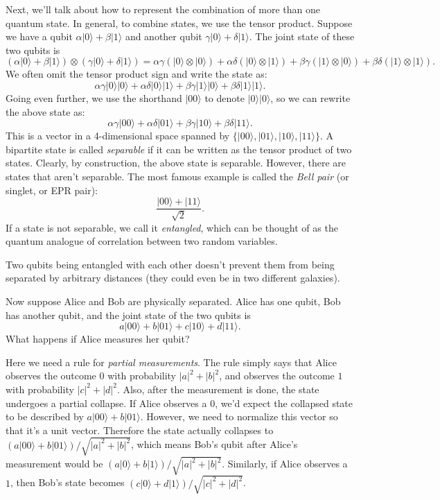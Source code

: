 \documentclass[11pt]{report}
\theoremstyle{plain}
\theoremstyle{definition}
\renewcommand{\ket}[1]{|#1\rangle}
\newcommand{\tensor}{\otimes}
\begin{document}
Next, we'll talk about how to represent the combination of more than one quantum state. In general, to combine states, we use the tensor product. Suppose we have a qubit $\alpha \ket{0} + \beta \ket{1}$ and another qubit $\gamma \ket{0} + \delta \ket{1}$. The joint state of these two qubits is
\[
(\alpha \ket{0} + \beta \ket{1}) \tensor (\gamma \ket{0} + \delta \ket{1}) = \alpha \gamma (\ket{0} \tensor \ket{0}) + \alpha \delta (\ket{0} \tensor \ket{1}) + \beta \gamma (\ket{1} \tensor \ket{0}) + \beta \delta (\ket{1} \tensor \ket{1}).
\]
We often omit the tensor product sign and write the state as:
\[
\alpha \gamma \ket{0}  \ket{0} + \alpha \delta \ket{0}  \ket{1} + \beta \gamma \ket{1}  \ket{0} + \beta \delta \ket{1}  \ket{1}.
\]
Going even further, we use the shorthand $\ket{00}$ to denote $\ket{0}\ket{0}$, so we can rewrite the above state as:
\[
\alpha \gamma \ket{00} + \alpha \delta \ket{01} + \beta \gamma \ket{10} + \beta \delta \ket{11}.
\]
This is a vector in a 4-dimensional space spanned by $\{\ket{00}, \ket{01}, \ket{10}, \ket{11}\}$. A bipartite state is called \emph{separable} if it can be written as the tensor product of two states. Clearly, by construction, the above state is separable. However, there are states that aren't separable. The most famous example is called the {\em Bell pair} (or singlet, or EPR pair):
\[
\frac{\ket{00} + \ket{11}}{\sqrt{2}}.
\]
If a state is not separable, we call it \emph{entangled}, which can be thought of as the quantum analogue of correlation between two random variables.

Two qubits being entangled with each other doesn't prevent them from being separated by arbitrary distances (they could even be in two different galaxies).

Now suppose Alice and Bob are physically separated. Alice has one qubit, Bob has another qubit, and the joint state of the two qubits is
\[
a \ket{00} + b \ket{01} + c \ket{10} + d \ket{11}.
\]
What happens if Alice measures her qubit?

Here we need a rule for \emph{partial measurements}. The rule simply says that Alice observes the outcome $0$ with probability $|a|^2 + |b|^2$, and observes the outcome $1$ with probability $|c|^2 + |d|^2$. Also, after the measurement is done, the state undergoes a partial collapse. If Alice observes a $0$, we'd expect the collapsed state to be described by $a \ket{00} + b \ket{01}$. However, we need to normalize this vector so that it's a unit vector. Therefore the state actually collapses to $(a \ket{00} + b \ket{01})/\sqrt{|a|^2 + |b|^2}$, which means Bob's qubit after Alice's measurement would be $(a \ket{0} + b \ket{1})/\sqrt{|a|^2 + |b|^2}$. Similarly, if Alice observes a $1$, then Bob's state becomes $(c \ket{0} + d \ket{1})/\sqrt{|c|^2 + |d|^2}$.
\end{document}
